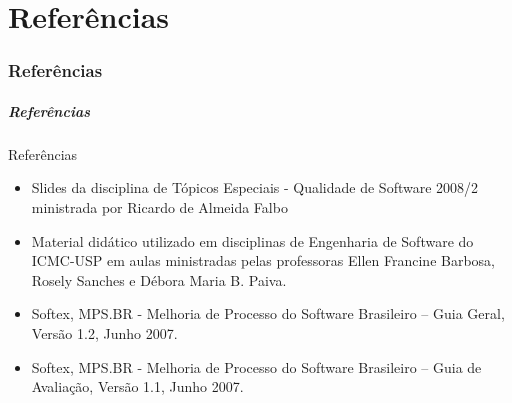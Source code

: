 \part{Referências}
\section*{Referências}

\nocite{Fairley:2009}

\begin{frame}[parent={ie:agenda}, hasnext=true, hasprev=false, label=references, allowframebreaks]
	\frametitle{Referências}
	
	\begin{block:fact}{Referências}
		\begin{itemize}
			\item Slides da disciplina de Tópicos Especiais - Qualidade de Software 2008/2 ministrada por Ricardo de Almeida Falbo
			\item Material didático utilizado em disciplinas de Engenharia de Software do ICMC-USP em aulas ministradas pelas professoras Ellen Francine Barbosa, Rosely Sanches e Débora Maria B. Paiva.
			\item Softex, MPS.BR - Melhoria de Processo do Software Brasileiro – Guia Geral, Versão 1.2, Junho 2007.
			\item Softex, MPS.BR - Melhoria de Processo do Software Brasileiro – Guia de Avaliação, Versão 1.1, Junho 2007.
		\end{itemize}
	\end{block:fact}
\end{frame}

\begin{frame}[parent={ie:agenda}, hasnext=true, hasprev=false, label=references, allowframebreaks]{\refname}

\tiny

\end{frame}